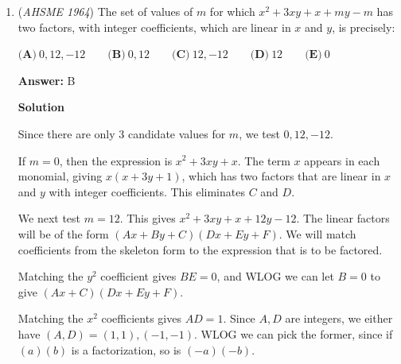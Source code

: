 \begin{enumerate}
\textbf{Solution 1}

Expanding the quadratic and collecting terms gives $y = 2x^2 - (2a + 2b)x + (a^2+b^2)$.  For a quadratic of the form $y = Ax^2 + Bx + C$ with $A>0$, $y$ is minimized when $x = -\frac{B}{2A}$, which is the average of the roots.

 Thus, the quadratic is minimized when $x = \frac{2a+2b}{2\cdot 2} = \frac{a+b}{2}$, which is answer $\boxed{\textbf{(A)}}$.

 



\textbf{Solution 2}

The problem should return real values for $ab = 0$ and $ab < 0$, which eliminates $E$ and $C$.  We want to distinguish between options $A, B, D$, and testing $(a, b) = (2, 0)$ should do that, as answers $A, B, D$ will turn into $1, 2, \sqrt{2}$, respectively.

 PLugging in $(a, b) = (2, 0)$ gives $y = (x - 2)^2 + x^2$, or $y = 2x^2 - 4x + 4$.  This has a minimum at $x = -\frac{-4}{4}$, or at $x=1$.  This is answer $\boxed{\textbf{(A)}}$.

 


	\item (\textit{AHSME 1964}) The set of values of $m$ for which $x^2+3xy+x+my-m$ has two factors, with integer coefficients, which are linear in $x$ and $y$, is precisely:


 $\textbf{(A)}\ 0, 12, -12\qquad \textbf{(B)}\ 0, 12\qquad \textbf{(C)}\ 12, -12\qquad \textbf{(D)}\ 12\qquad \textbf{(E)}\ 0$

 \textbf{Answer: }B



\textbf{Solution}

Since there are only $3$ candidate values for $m$, we test $0, 12, -12$.

 If $m=0$, then the expression is $x^2 + 3xy + x$.  The term $x$ appears in each monomial, giving $x(x + 3y + 1)$, which has two factors that are linear in $x$ and $y$ with integer coefficients.  This eliminates $C$ and $D$.

 We next test $m=12$.  This gives $x^2 + 3xy + x + 12y - 12$.  The linear factors will be of the form $(Ax + By + C)(Dx + Ey + F)$.  We will match coefficients from the skeleton form to the expression that is to be factored.

 Matching the $y^2$ coefficient gives $BE = 0$, and WLOG we can let $B=0$ to give $(Ax + C)(Dx + Ey + F)$.  

 Matching the $x^2$ coefficients gives $AD = 1$.  Since $A, D$ are integers, we either have $(A, D) = (1, 1), (-1, -1)$.  WLOG we can pick the former, since if $(a)(b)$ is a factorization, so is $(-a)(-b)$.  


\end{enumerate}
